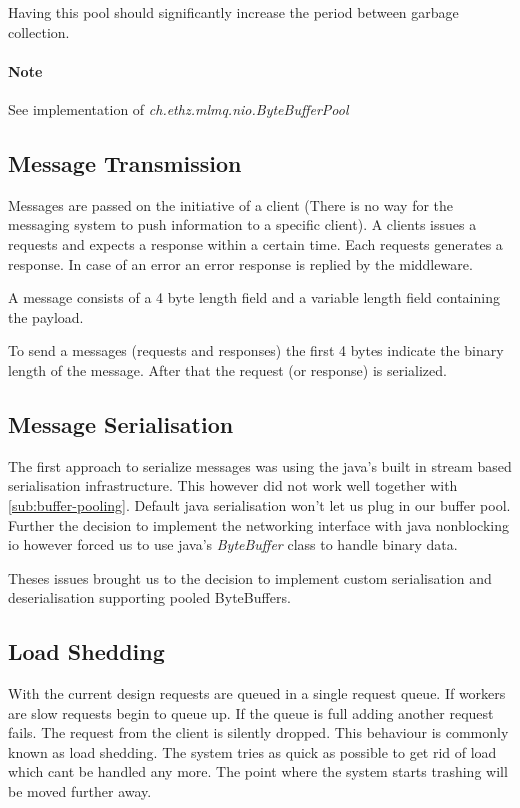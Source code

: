 \documentclass[milestone1.tex]{subfiles}
\begin{document}
Having this pool should significantly increase the period between garbage collection.

\paragraph{Note}
See implementation of \textit{ch.ethz.mlmq.nio.ByteBufferPool}

\subsection{Message Transmission}
Messages are passed on the initiative of a client (There is no way for the messaging system to push information to a specific client). A clients issues a requests and expects a response within a certain time. Each requests generates a response. In case of an error an error response is replied by the middleware.

A message consists of a 4 byte length field and a variable length field containing the payload.

To send a messages (requests and responses) the first 4 bytes indicate the binary length of the message. After that the request (or response) is serialized.

\subsection{Message Serialisation}

The first approach to serialize messages was using the java's built in stream based serialisation infrastructure. This however did not work well together with \ref{sub:buffer-pooling}. Default java serialisation won't let us plug in our buffer pool. Further the decision to implement the networking interface with java nonblocking io however forced us to use java's \textit{ByteBuffer} class to handle binary data.

Theses issues brought us to the decision to implement custom serialisation and deserialisation supporting pooled ByteBuffers.

\subsection{Load Shedding}
With the current design requests are queued in a single request queue. If workers are slow requests begin to queue up. If the queue is full adding another request fails. The request from the client is silently dropped. This behaviour is commonly known as load shedding. The system tries as quick as possible to get rid of load which cant be handled any more. The point where the system starts trashing will be moved further away.
\end{document}
